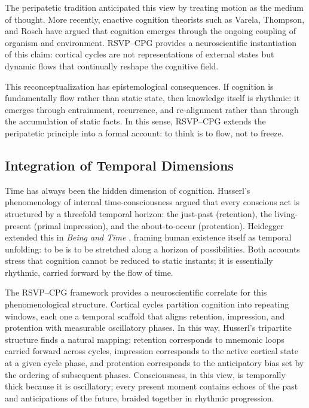 \documentclass{article}
\begin{document}
The peripatetic tradition anticipated this view by treating motion as the medium of thought. More recently, enactive cognition theorists such as Varela, Thompson, and Rosch \citep{varela1991embodied} have argued that cognition emerges through the ongoing coupling of organism and environment. RSVP--CPG provides a neuroscientific instantiation of this claim: cortical cycles are not representations of external states but dynamic flows that continually reshape the cognitive field.

This reconceptualization has epistemological consequences. If cognition is fundamentally flow rather than static state, then knowledge itself is rhythmic: it emerges through entrainment, recurrence, and re-alignment rather than through the accumulation of static facts. In this sense, RSVP--CPG extends the peripatetic principle into a formal account: to think is to flow, not to freeze.


\subsection{Integration of Temporal Dimensions}

Time has always been the hidden dimension of cognition. Husserl’s phenomenology of internal time-consciousness \citep{husserl1966phenomenology} argued that every conscious act is structured by a threefold temporal horizon: the just-past (retention), the living-present (primal impression), and the about-to-occur (protention). Heidegger extended this in \emph{Being and Time} \citep{heidegger1927being}, framing human existence itself as temporal unfolding: to be is to be stretched along a horizon of possibilities. Both accounts stress that cognition cannot be reduced to static instants; it is essentially rhythmic, carried forward by the flow of time.

The RSVP--CPG framework provides a neuroscientific correlate for this phenomenological structure. Cortical cycles partition cognition into repeating windows, each one a temporal scaffold that aligns retention, impression, and protention with measurable oscillatory phases. In this way, Husserl’s tripartite structure finds a natural mapping: retention corresponds to mnemonic loops carried forward across cycles, impression corresponds to the active cortical state at a given cycle phase, and protention corresponds to the anticipatory bias set by the ordering of subsequent phases. Consciousness, in this view, is temporally thick because it is oscillatory; every present moment contains echoes of the past and anticipations of the future, braided together in rhythmic progression.
\end{document}
